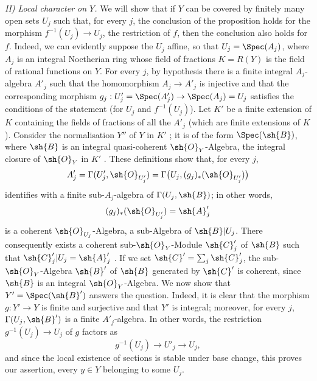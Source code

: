 \emph{II) Local character on $Y$.}
We will show that if $Y$ can be covered by finitely many open sets $U_j$ such that, for every $j$, the conclusion of the proposition holds for the morphism $f^{-1}(U_j)\to U_j$, the restriction of $f$, then the conclusion also holds for $f$.
Indeed, we can evidently suppose the $U_j$ affine, so that $U_j=\Spec(A_j)$, where $A_j$ is an integral Noetherian ring whose field of fractions $K=R(Y)$ is the field of rational functions on $Y$.
For every $j$, by hypothesis there is a finite integral $A_j$-algebra $A'_j$ such that the homomorphism $A_j\to A'_j$ is injective  and that the corresponding morphism $g_j:U'_j=\Spec(A'_j)\to\Spec(A_j)=U_j$ satisfies the conditions of the statement (for $U_j$ and $f^{-1}(U_j)$).
Let $K'$ be a finite extension of $K$ containing the fields of fractions of all the $A'_j$ (which are finite extensions of $K$).
Consider the normalisation $Y''$ of $Y$ in $K'$ ; it is of the form $\Spec(\sh{B})$, where $\sh{B}$ is an integral quasi-coherent $\sh{O}_Y$-Algebra, the integral closure of $\sh{O}_Y$ in $K'$ .
These definitions show that, for every $j$,
\[
 A'_j=\Gamma(U'_j,\sh{O}_{U'_j})
     =\Gamma\bigl(U_j,(g_j)_*(\sh{O}_{U'_j})\bigr)
\]
identifies with a finite sub-$A_j$-algebra of $\Gamma(U_j,\sh{B})$; in other words,
\[
 (g_j)_*(\sh{O}_{U'_j})=\sh{A}'_j
\]
is a coherent $\sh{O}_{U_j}$-Algebra, a sub-Algebra of $\sh{B}|U_j$.
There consequently exists a coherent sub-$\sh{O}_Y$-Module $\sh{C}'_j$ of $\sh{B}$ such that $\sh{C}'_j|U_j=\sh{A}'_j$ .
If we set $\sh{C}'=\sum_j\sh{C}'_j$, the sub-$\sh{O}_Y$-Algebra $\sh{B}'$ of $\sh{B}$ generated by $\sh{C}'$ is coherent, since $\sh{B}$ is an integral $\sh{O}_Y$-Algebra.
We now show that $Y'=\Spec(\sh{B}')$ answers the question.
Indeed, it is clear that the morphism $g:Y'\to Y$ is finite and surjective and that $Y'$ is integral; moreover, for every $j$, $\Gamma(U_j,\sh{B}')$ is a finite $A'_j$-algebra.
In other words, the restriction $g^{-1}(U_j)\to U_j$ of $g$ factors as
\[
 g^{-1}(U_j)\longrightarrow U'_j\longrightarrow U_j,
\]
and since the local existence of sections is stable under base change, this proves our assertion, every $y\in Y$ belonging to some $U_j$.

